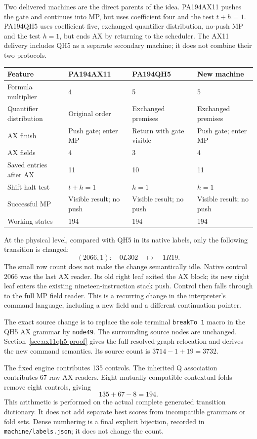 \documentclass[11pt,letterpaper]{article}
\newcommand{\file}[1]{\texttt{\nolinkurl{#1}}}
\begin{document}
Two delivered machines are the direct parents of the idea. PA194AX11
pushes the gate and continues into MP, but uses coefficient four and the
test $t+h=1$. PA194QH5 uses coefficient five, exchanged quantifier
distribution, no-push MP and the test $h=1$, but ends AX by returning to
the scheduler. The AX11 delivery includes QH5 as a separate secondary
machine; it does not combine their two protocols.

\begin{center}\small
\begin{tabularx}{\linewidth}{@{}lXXX@{}}
\toprule
Feature & PA194AX11 & PA194QH5 & New machine\\\midrule
Formula multiplier &4&5&5\\
Quantifier distribution &Original order&Exchanged premises&Exchanged premises\\
AX finish &Push gate; enter MP&Return with gate visible&Push gate; enter MP\\
AX fields &4&3&4\\
Saved entries after AX &11&10&11\\
Shift halt test &$t+h=1$&$h=1$&$h=1$\\
Successful MP &Visible result; no push&Visible result; no push&Visible result; no push\\
Working states &194&194&194\\
\bottomrule
\end{tabularx}
\end{center}

At the physical level, compared with QH5 in its native labels, only the
following transition is changed:
\[
 (2066,1):\quad 0L302\quad\longmapsto\quad1R19.
\]
The small row count does not make the change semantically idle. Native
control 2066 was the last AX reader. Its old right leaf exited the AX
block; its new right leaf enters the existing nineteen-instruction stack
push. Control then falls through to the full MP field reader. This is a
recurring change in the interpreter's command language, including a new
field and a different continuation pointer.

The exact source change is to replace the sole terminal
\texttt{breakTo 1} macro in the QH5 AX grammar by \texttt{node49}.
The surrounding source nodes are unchanged. Section~\ref{sec:ax11qh5-proof}
gives the full resolved-graph relocation and derives the new command
semantics. Its source count is $3714-1+19=3732$.

The fixed engine contributes 135 controls. The inherited Q association
contributes 67 raw AX readers. Eight mutually compatible contextual folds
remove eight controls, giving
\[
                 135+67-8=194.
\]
This arithmetic is performed on the actual complete generated transition
dictionary. It does not add separate best scores from incompatible
grammars or fold sets. Dense numbering is a final explicit bijection,
recorded in \file{machine/labels.json}; it does not change the count.
\end{document}
